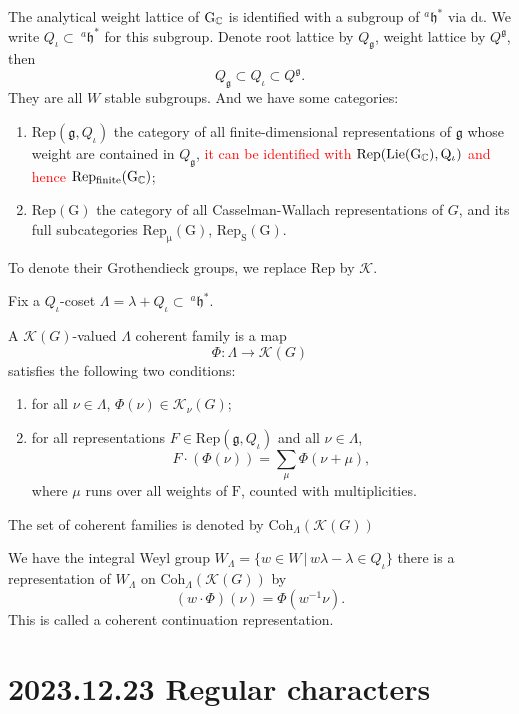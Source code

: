 \documentclass[12pt]{amsart}
\numberwithin{equation}{section}
\newcommand{\fg}{\mathfrak{g}} \newcommand{\fh}{\mathfrak{h}} \newcommand{\fk}{\mathfrak{k}}
\newcommand{\set}[2]{\{#1\,|\,#2\}}
\begin{document}
The analytical weight lattice of $\mathrm{G_{\mathbb {C}}}$ is identified with a subgroup of $^{a}\fh^*$ via $\mathrm{d\iota}$.
We write $Q_\iota \subset \  ^{a}\fh^*$ for this subgroup. Denote root lattice by $Q_\fg$,
weight lattice by $Q^\fg$, then $$Q_\fg \subset Q_\iota \subset Q^\fg.$$
They are all $W$ stable subgroups.
And we have some categories:
\begin{enumerate}
  \item $\mathrm{Rep}(\fg,Q_\iota)$ the category of all finite-dimensional representations of $\fg$ whose weight are contained in $Q_\fg$, \textcolor{red}{it can be identified with $\mathrm{Rep(Lie(G_{\mathbb {C}}),Q_\iota)}$ and hence $\mathrm{Rep_{finite}(G_{\mathbb {C}})}$};
  \item $\mathrm{Rep(G)}$ the category of all Casselman-Wallach representations of $G$, and its full subcategories $\mathrm{Rep_\mu(G)}$, $\mathrm{Rep_S(G)}$.
\end{enumerate}
To denote their Grothendieck groups, we replace $\mathrm{Rep}$ by $\mathcal{K}$.


Fix a $Q_\iota$-coset $\Lambda = \lambda + Q_\iota \subset \  ^{a}\fh^*$.


\begin{defn}
  A $\mathcal{K}(G)$-valued $\Lambda$ coherent family is a map
  $$\varPhi : \Lambda \to \mathcal{K}(G)$$
  satisfies the following two conditions:
  \begin{enumerate}
    \item for all $\nu \in \Lambda$, $\varPhi(\nu) \in \mathcal{K}_{\nu}(G)$;
    \item for all representations $F \mathrm{ \in Rep}(\fg,Q_\iota)$ and all $\nu \in \Lambda$,
          $$F \cdot (\varPhi(\nu)) = \sum\limits_{\mu} \varPhi(\nu + \mu),$$
          where $\mu$ runs over all weights of $\mathrm{F}$, counted with multiplicities.
  \end{enumerate}
  The set of coherent families is denoted by $\mathrm{Coh}_\Lambda(\mathcal{K}(G))$
\end{defn}
We have the integral Weyl group $W_{\Lambda} = \set{w \in W}{w\lambda - \lambda \in Q_\iota}$
there is a representation of $W_\Lambda$ on $\mathrm{Coh}_\Lambda(\mathcal{K}(G))$ by
$$(w \cdot \varPhi)(\nu) = \varPhi (w^{-1}\nu).$$
This is called a coherent continuation representation.




\section{2023.12.23 Regular characters}\label{2}
\end{document}

